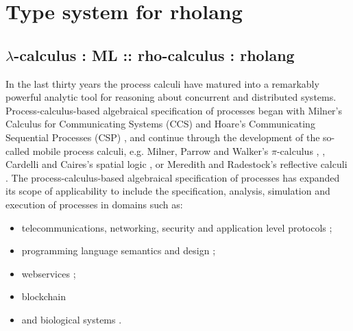 \section{Type system for rholang}
\subsection{$\lambda$-calculus : ML :: rho-calculus : rholang }\label{sec:concurrent_process_calculi_and_spatial_logics_} %
In the last thirty years the process calculi have matured into a
remarkably powerful analytic tool for reasoning about concurrent and
distributed systems. Process-calculus-based algebraical specification of
processes began with Milner's Calculus for Communicating Systems (CCS)
\cite{DBLP:books/sp/Milner80} and Hoare's Communicating Sequential Processes
(CSP) \cite{DBLP:books/ph/Hoare85}, and continue
through the development of the so-called mobile process calculi,
e.g. Milner, Parrow and Walker's $\pi$-calculus \cite{DBLP:journals/iandc/MilnerPW92a}, \cite{DBLP:journals/iandc/MilnerPW92b},
Cardelli and Caires's spatial logic \cite{DBLP:conf/fossacs/Caires04} \cite{DBLP:journals/iandc/CairesC03} \cite{DBLP:journals/tcs/CairesC04}, or Meredith and Radestock's reflective calculi
\cite{DBLP:journals/entcs/MeredithR05} \cite{DBLP:conf/tgc/MeredithR05}. The process-calculus-based
algebraical specification of processes has expanded its scope of
applicability to include the specification, analysis, simulation and
execution of processes in domains such as:

\begin{itemize}
\item telecommunications, networking, security and application level protocols
\cite{DBLP:conf/popl/AbadiB02} 
\cite{DBLP:journals/tcs/AbadiB03} 
\cite{DBLP:conf/epew/BrownLM05} 
\cite{DBLP:conf/fossacs/LaneveZ05}; 
\item programming language semantics and design
\cite{DBLP:conf/epew/BrownLM05}
\cite{djoin}
\cite{DBLP:conf/afp/FournetFMS02}
\cite{DBLP:journals/toplas/SewellWU10};
\item webservices
\cite{DBLP:conf/epew/BrownLM05}
\cite{DBLP:conf/fossacs/LaneveZ05}
\cite{DBLP:conf/wise/Meredith03};
\item{blockchain}
  \cite{meredith_2017}
\item and biological systems
\cite{DBLP:conf/cmsb/Cardelli04}
\cite{DBLP:conf/esop/DanosL03}
\cite{DBLP:conf/psb/RegevSS01}
\cite{DBLP:journals/ipl/PriamiRSS01}.
\end{itemize}


